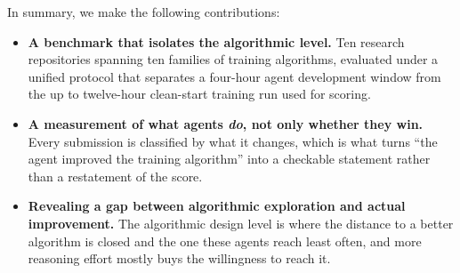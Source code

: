 In summary, we make the following contributions:
\begin{itemize}[leftmargin=1.2em,itemsep=3pt,topsep=3pt,parsep=0pt]
  \item \textbf{A benchmark that isolates the algorithmic level.} Ten research repositories spanning ten families of training algorithms, evaluated under a unified protocol that separates a four-hour agent development window from the up to twelve-hour clean-start training run used for scoring.
  \item \textbf{A measurement of what agents \emph{do}, not only whether they win.} Every submission is classified by what it changes, which is what turns
    ``the agent improved the training algorithm'' into a checkable statement
    rather than a restatement of the score.
\item \textbf{Revealing a gap between algorithmic exploration and actual improvement.}
    The algorithmic design level is where the distance to a better algorithm is closed and the one these agents reach least often, and more reasoning effort mostly buys the willingness to reach it.
\end{itemize}


